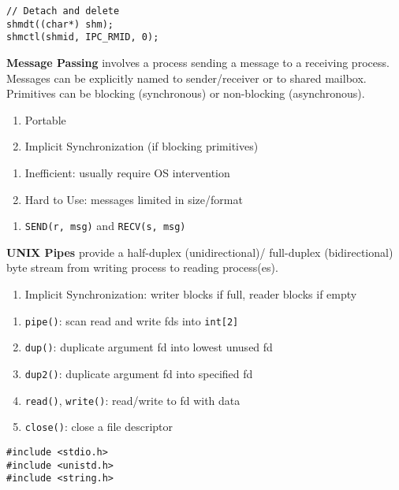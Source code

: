 \documentclass[12pt, a4paper]{article}
\begin{document}
\begin{multicols*}{3}
\begin{lstlisting}
// Detach and delete
shmdt((char*) shm);
shmctl(shmid, IPC_RMID, 0);
\end{lstlisting}

\textbf{Message Passing} involves a process sending a message to a receiving process. Messages can be explicitly named to sender/receiver or to shared mailbox. Primitives can be blocking (synchronous) or non-blocking (asynchronous).
\begin{enumerate}[$+$]
  \item Portable 
  \item Implicit Synchronization (if blocking primitives)
\end{enumerate}\vspace{-1pt}
\begin{enumerate}[$-$]
  \item Inefficient: usually require OS intervention
  \item Hard to Use: messages limited in size/format
\end{enumerate}\vspace{-1pt}
\begin{enumerate}[\roman*.]
  \item \lstinline|SEND(r, msg)| and \lstinline|RECV(s, msg)|
\end{enumerate}

\colbreak
\textbf{UNIX Pipes} provide a half-duplex (unidirectional)/ full-duplex (bidirectional) byte stream from writing process to reading process(es).
\begin{enumerate}[$+$]
  \item Implicit Synchronization: writer blocks if full, reader blocks if empty
\end{enumerate}\vspace{-1pt}
\begin{enumerate}[\roman*.]
  \item \lstinline|pipe()|: scan read and write fds into \lstinline|int[2]| 
  \item \lstinline|dup()|: duplicate argument fd into lowest unused fd 
  \item \lstinline|dup2()|: duplicate argument fd into specified fd 
  \item \lstinline|read()|, \lstinline|write()|: read/write to fd with data
  \item \lstinline|close()|: close a file descriptor
\end{enumerate}
\begin{lstlisting}
#include <stdio.h>
#include <unistd.h>
#include <string.h>


\end{lstlisting}
\end{multicols*}
\end{document}

